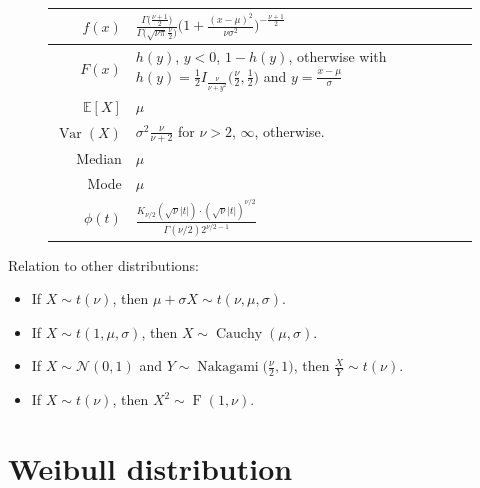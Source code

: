 \documentclass[a4paper,11pt]{article}
\theoremstyle{plain}
\theoremstyle{definition}
\newcommand{\ME}{\mathbb{E}}
\newcommand{\Var}{\operatorname{Var}}
\begin{document}
\begin{figure}[!htb]
\begin{minipage}{0.4\textwidth}
\begin{tabular}{| r | l |}
				\hline
				$f(x)$ & $\frac{\Gamma \big( \frac{\nu + 1}{2} \big)}{\Gamma \big( \sqrt{\nu \pi} \frac{\nu}{2} \big)} \big(1+\frac{(x-\mu)^2}{\nu \sigma^2} \big)^{-\frac{\nu+1}{2}}$ \\
				\hline
				$F(x)$ & \pbox{\linewidth}{$h(y)$, $y < 0$, \\ $ 1 - h(y)$, otherwise \\ with $h(y)=\frac{1}{2} I_\frac{\nu}{\nu+y^2}\big(\frac{\nu}{2}, \frac{1}{2}\big)$ \\ and $y=\frac{x-\mu}{\sigma}$}\\
				\hline
				$\ME[X]$ & $\mu$ \\
				\hline
				$\Var(X)$ & \pbox{\linewidth}{$\sigma^2 \frac{\nu}{\nu+2}$ for $\nu > 2$,\\ $\infty$, otherwise.} \\
				\hline
				Median & $\mu$ \\
				\hline
				Mode & $\mu$ \\
				\hline
				$\phi(t)$ & $ \frac{K_{\nu/2}(\sqrt{\nu}|t|) \cdot (\sqrt{\nu}|t|)^{\nu/2}}{\Gamma(\nu/2)2^{\nu/2-1} } $ \\
				\hline
			\end{tabular}
		\end{minipage}
	\end{figure}
Relation to other distributions:
\begin{itemize}	
	\item If $X \sim t(\nu)$, then $\mu + \sigma X \sim t(\nu, \mu, \sigma)$. 
	\item If $X \sim t(1, \mu, \sigma)$, then $X \sim \operatorname{Cauchy}(\mu, \sigma)$.
	\item If $X \sim \mathcal{N}(0, 1)$ and $Y \sim \operatorname{Nakagami}\big(\frac{\nu}{2}, 1\big)$, then $\frac{X}{Y} \sim t(\nu)$.
	\item If $X \sim t(\nu)$, then $X^2 \sim \operatorname{F}(1, \nu)$.
\end{itemize}


\pagebreak
\section{Weibull distribution}
\end{document}
